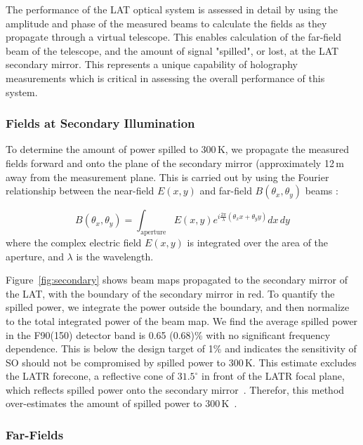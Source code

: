The performance of the LAT optical system is assessed in detail by using the amplitude and phase of the measured beams to calculate the fields as they propagate through a virtual telescope.  This enables calculation of the far-field beam of the telescope, and the amount of signal "spilled", or lost, at the LAT secondary mirror.  This represents a unique capability of holography measurements which is critical in assessing the overall performance of this system. 

\subsubsection{Fields at Secondary Illumination}
To determine the amount of power spilled to 300\,K, we propagate the measured fields forward and onto the plane of the secondary mirror (approximately 12\,m away from the measurement plane.  This is carried out by using the Fourier relationship between the near-field $E(x,y)$ and far-field $B(\theta_x,\theta_y)$ beams \cite{McIntosh2016,alma_holog}:

\begin{equation}
    B(\theta_x,\theta_y) = \int_{\text{aperture}} E(x,y) e^{ i \frac{2\pi}{\lambda} (\theta_x x + \theta_y y )} dx \, dy 
    \label{eq:fft}
\end{equation}
where the complex electric field $E(x,y)$ is integrated over the area of the aperture, and $\lambda$ is the wavelength.

Figure~\ref{fig:secondary} shows beam maps propagated to the secondary mirror of the LAT, with the boundary  of the secondary mirror in red.  To quantify the spilled power, we integrate the power outside the boundary, and then normalize to the total integrated power of the beam map.  We find the average spilled power in the F90(150) detector band is 0.65 (0.68)\% with no significant frequency dependence.  This is below the design target of 1\% and indicates the sensitivity of SO should not be compromised by spilled power to 300\,K.  This estimate excludes the LATR forecone, a reflective cone of $31.5^\circ$ in front of the LATR focal plane, which reflects spilled power onto the secondary mirror~\cite{2021RNAAS...5..100X}.  Therefor, this method over-estimates the amount of spilled power to 300\,K~\cite{Gudmundsson:21}.

\subsubsection{Far-Fields}


